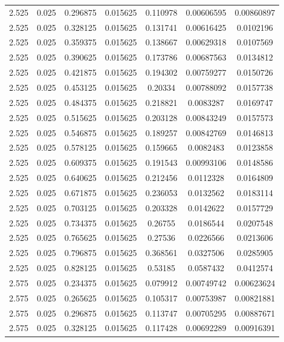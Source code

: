 \begin{table}[bh]
\begin{center}
{\begin{tabular}{ccccccc}
2.525	 & 0.025 & 	0.296875	 & 0.015625	 & 0.110978	 & 0.00606595	 & 0.00860897 \\ 
2.525	 & 0.025 & 	0.328125	 & 0.015625	 & 0.131741	 & 0.00616425	 & 0.0102196 \\ 
2.525	 & 0.025 & 	0.359375	 & 0.015625	 & 0.138667	 & 0.00629318	 & 0.0107569 \\ 
2.525	 & 0.025 & 	0.390625	 & 0.015625	 & 0.173786	 & 0.00687563	 & 0.0134812 \\ 
2.525	 & 0.025 & 	0.421875	 & 0.015625	 & 0.194302	 & 0.00759277	 & 0.0150726 \\ 
2.525	 & 0.025 & 	0.453125	 & 0.015625	 & 0.20334	 & 0.00788092	 & 0.0157738 \\ 
2.525	 & 0.025 & 	0.484375	 & 0.015625	 & 0.218821	 & 0.0083287	 & 0.0169747 \\ 
2.525	 & 0.025 & 	0.515625	 & 0.015625	 & 0.203128	 & 0.00843249	 & 0.0157573 \\ 
2.525	 & 0.025 & 	0.546875	 & 0.015625	 & 0.189257	 & 0.00842769	 & 0.0146813 \\ 
2.525	 & 0.025 & 	0.578125	 & 0.015625	 & 0.159665	 & 0.0082483	 & 0.0123858 \\ 
2.525	 & 0.025 & 	0.609375	 & 0.015625	 & 0.191543	 & 0.00993106	 & 0.0148586 \\ 
2.525	 & 0.025 & 	0.640625	 & 0.015625	 & 0.212456	 & 0.0112328	 & 0.0164809 \\ 
2.525	 & 0.025 & 	0.671875	 & 0.015625	 & 0.236053	 & 0.0132562	 & 0.0183114 \\ 
2.525	 & 0.025 & 	0.703125	 & 0.015625	 & 0.203328	 & 0.0142622	 & 0.0157729 \\ 
2.525	 & 0.025 & 	0.734375	 & 0.015625	 & 0.26755	 & 0.0186544	 & 0.0207548 \\ 
2.525	 & 0.025 & 	0.765625	 & 0.015625	 & 0.27536	 & 0.0226566	 & 0.0213606 \\ 
2.525	 & 0.025 & 	0.796875	 & 0.015625	 & 0.368561	 & 0.0327506	 & 0.0285905 \\ 
2.525	 & 0.025 & 	0.828125	 & 0.015625	 & 0.53185	 & 0.0587432	 & 0.0412574 \\ 
2.575	 & 0.025 & 	0.234375	 & 0.015625	 & 0.079912	 & 0.00749742	 & 0.00623624 \\ 
2.575	 & 0.025 & 	0.265625	 & 0.015625	 & 0.105317	 & 0.00753987	 & 0.00821881 \\ 
2.575	 & 0.025 & 	0.296875	 & 0.015625	 & 0.113747	 & 0.00705295	 & 0.00887671 \\ 
2.575	 & 0.025 & 	0.328125	 & 0.015625	 & 0.117428	 & 0.00692289	 & 0.00916391 \\ 

\end{tabular}}
\end{center}
\end{table}
